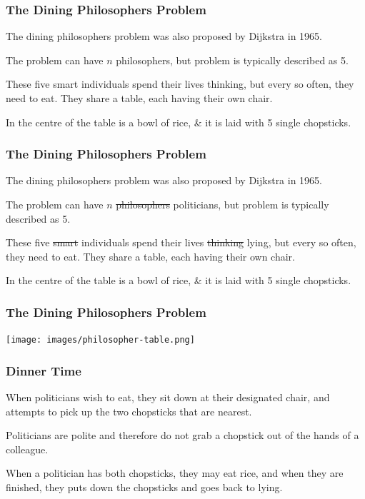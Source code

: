 \begin{frame}
	\frametitle{The Dining Philosophers Problem}

	The dining philosophers problem was also proposed by Dijkstra in 1965.

	The problem can have $n$ philosophers, but problem is typically described as 5.

	These five smart individuals spend their lives thinking, but every so often, they need to eat. They share a table, each having their own chair.

	In the centre of the table is a bowl of rice, \& it is laid with 5 single chopsticks.

\end{frame}


\begin{frame}
	\frametitle{The Dining Philosophers Problem}

	The dining philosophers problem was also proposed by Dijkstra in 1965.

	The problem can have $n$ \alert{\sout{philosophers} politicians}, but problem is typically described as 5.

	These five \alert{\sout{smart}} individuals spend their lives \alert{\sout{thinking} lying}, but every so often, they need to eat. They share a table, each having their own chair.

	In the centre of the table is a bowl of rice, \& it is laid with 5 single chopsticks.

\end{frame}

\begin{frame}
	\frametitle{The Dining Philosophers Problem}

	\begin{center}
		\texttt{[image: images/philosopher-table.png]}
	\end{center}

\end{frame}

\begin{frame}
	\frametitle{Dinner Time}

	When politicians wish to eat, they sit down at their designated chair, and attempts to pick up the two chopsticks that are nearest.

	Politicians are polite and therefore do not grab a chopstick out of the hands of a colleague.

	When a politician has both chopsticks, they may eat rice, and when they are finished, they puts down the chopsticks and goes back to lying.


\end{frame}

